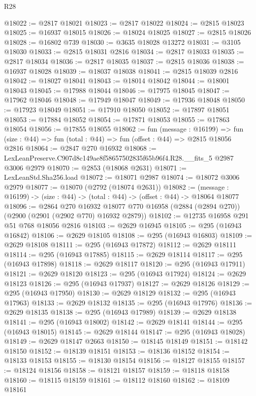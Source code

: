 \begin{lexlean}{R28}
\begin{coremodule}
@18022 := @2817 @18021
@18023 := @2817 @18022
@18024 := @2815 @18023
@18025 := @16937 @18015
@18026 := @18024 @18025
@18027 := @2815 @18026
@18028 := @16802 @739
@18030 := @3635 @18028 @13272
@18031 := @3105 @18030
@18033 := @2815 @18031 @2816
@18034 := @2817 @18033
@18035 := @2817 @18034
@18036 := @2817 @18035
@18037 := @2815 @18036
@18038 := @16937 @18028
@18039 := @18037 @18038
@18041 := @2815 @18039 @2816
@18042 := @18027 @18041
@18043 := @18014 @18042
@18044 := @18001 @18043
@18045 := @17988 @18044
@18046 := @17975 @18045
@18047 := @17962 @18046
@18048 := @17949 @18047
@18049 := @17936 @18048
@18050 := @17923 @18049
@18051 := @17910 @18050
@18052 := @17897 @18051
@18053 := @17884 @18052
@18054 := @17871 @18053
@18055 := @17863 @18054
@18056 := @17855 @18055
@18062 := fun (message : @16199) =>
  fun (size : @44) => fun (total : @44) => fun (offset : @44) => @2815 @18056 @2816
@18064 := @2847 @270 @16932
@18068 := LexLeanPreserve.C907d8c149ae8f58657502835f65b96f4.R28.__fits_5 @2987 @3006 @2979
@18070 := @2853 (@18068 @2631)
@18071 := LexLeanStd.Sha256.load
@18072 := @18071 @2987
@18074 := @18072 @3006 @2979
@18077 := @18070 (@2792 (@18074 @2631))
@18082 := (message : @16199) -> (size : @44) -> (total : @44) -> (offset : @44) -> @18064 @18077
@18096 := @2864
    @270
    @16932
    @18077
    @770
    @16958
    (@2884 (@2894 @270))
    (@2900 (@2901 (@2902 @770) @16932 @2879))
@18102 := @12735 @16958 @291 @51 @768 @18056 @2816
@18103 := @2629 @16945
@18105 := @295 (@16943 @16842)
@18106 := @2629 @18105
@18108 := @295 (@16943 @16803)
@18109 := @2629 @18108
@18111 := @295 (@16943 @17872)
@18112 := @2629 @18111
@18114 := @295 (@16943 @17885)
@18115 := @2629 @18114
@18117 := @295 (@16943 @17898)
@18118 := @2629 @18117
@18120 := @295 (@16943 @17911)
@18121 := @2629 @18120
@18123 := @295 (@16943 @17924)
@18124 := @2629 @18123
@18126 := @295 (@16943 @17937)
@18127 := @2629 @18126
@18129 := @295 (@16943 @17950)
@18130 := @2629 @18129
@18132 := @295 (@16943 @17963)
@18133 := @2629 @18132
@18135 := @295 (@16943 @17976)
@18136 := @2629 @18135
@18138 := @295 (@16943 @17989)
@18139 := @2629 @18138
@18141 := @295 (@16943 @18002)
@18142 := @2629 @18141
@18144 := @295 (@16943 @18015)
@18145 := @2629 @18144
@18147 := @295 (@16943 @18028)
@18149 := @2629 @18147 @2663
@18150 := @18145 @18149
@18151 := @18142 @18150
@18152 := @18139 @18151
@18153 := @18136 @18152
@18154 := @18133 @18153
@18155 := @18130 @18154
@18156 := @18127 @18155
@18157 := @18124 @18156
@18158 := @18121 @18157
@18159 := @18118 @18158
@18160 := @18115 @18159
@18161 := @18112 @18160
@18162 := @18109 @18161

\end{coremodule}
\end{lexlean}
